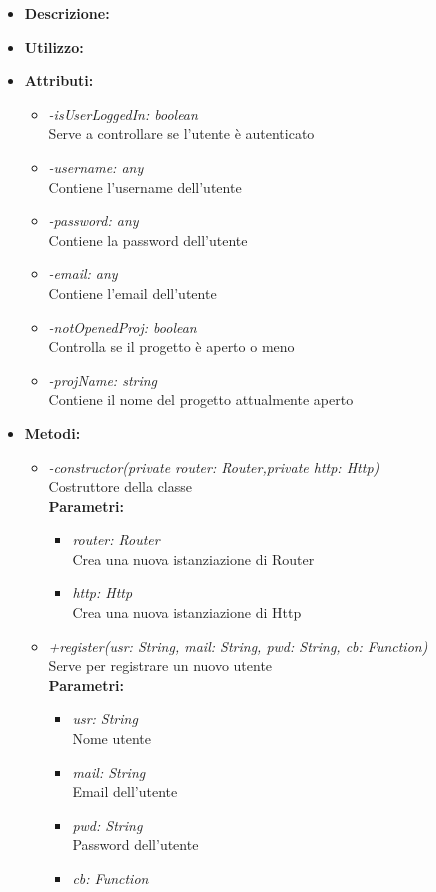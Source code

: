 \begin{itemize}
	\item \textbf{Descrizione:}\\
	
	\item \textbf{Utilizzo:}\\
	
	\item \textbf{Attributi:}
		\begin{itemize}
			\item \emph{-isUserLoggedIn: boolean}\\
			Serve a controllare se l'utente è autenticato
			\item \emph{-username: any}\\
			Contiene l'username dell'utente
			\item \emph{-password: any}\\
			Contiene la password dell'utente
			\item \emph{-email: any}\\
			Contiene l'email dell'utente
			\item \emph{-notOpenedProj: boolean}\\
			Controlla se il progetto è aperto o meno
			\item \emph{-projName: string}\\
			Contiene il nome del progetto attualmente aperto
		\end{itemize}
	\item \textbf{Metodi:}
		\begin{itemize}
			\item \emph{-constructor(private router: Router,private http: Http)}\\
    		Costruttore della classe\\
    		\textbf{Parametri:}
    		\begin{itemize}
    			\item \emph{router: Router}\\
    			Crea una nuova istanziazione di Router
    			\item \emph{http: Http}\\
    			Crea una nuova istanziazione di Http
    		\end{itemize}
    		\item \emph{+register(usr: String, mail: String, pwd: String, cb: Function)}\\
    		Serve per registrare un nuovo utente\\
    		\textbf{Parametri:}
    		\begin{itemize}
    			\item \emph{usr: String}\\
    			Nome utente
    			\item \emph{mail: String}\\
    			Email dell'utente
    			\item \emph{pwd: String}\\
    			Password dell'utente
    			\item \emph{cb: Function}\\
    			

\end{itemize}
\end{itemize}
\end{itemize}
